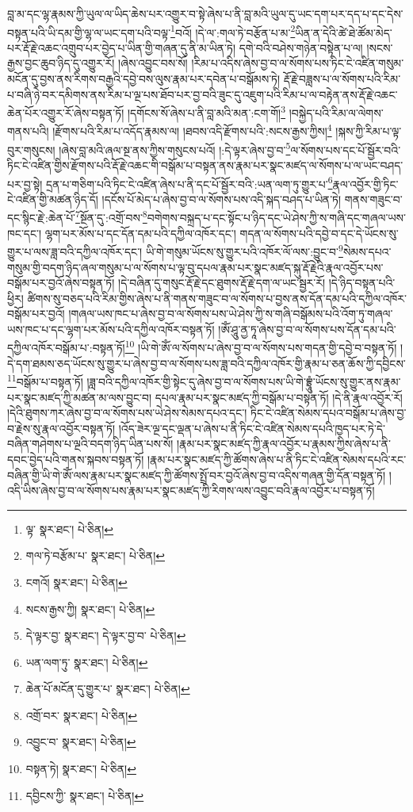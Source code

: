 བླ་མ་དང་ལྷ་རྣམས་ཀྱི་ཡུལ་ལ་ཡིད་ཆེས་པར་འགྱུར་བ་སྟེ་ཞེས་པ་ནི་བླ་མའི་ཡུལ་དུ་ཡང་དག་པར་དད་པ་དང་དེས་བསྟན་པའི་ཡི་དམ་གྱི་ལྷ་ལ་ཡང་དག་པའི་བལྟ་\footnote{ལྟ་  སྣར་ཐང་།  པེ་ཅིན། }བའོ། །དེ་ལ་:གལ་ཏེ་བརྩོན་པ་མ་\footnote{གལ་ཏེ་བརྩོམ་པ་  སྣར་ཐང་།  པེ་ཅིན། }ཡིན་ན་དེའི་ཚེ་ཐེ་ཚོམ་མེད་པར་རྡོ་རྗེ་འཆང་འགྲུབ་པར་བྱེད་པ་ཡིན་གྱི་གཞན་དུ་ནི་མ་ཡིན་ཏེ། དགེ་བའི་བཤེས་གཉེན་བསྟེན་པ་ལ། །སངས་རྒྱས་བྱང་ཆུབ་ཉིད་དུ་འགྱུར་རོ། །ཞེས་འབྱུང་བས་སོ། །རིམ་པ་འདིས་ཞེས་བྱ་བ་ལ་སོགས་པས་ཏིང་ངེ་འཛིན་གསུམ་མངོན་དུ་བྱས་ནས་རིགས་བརྒྱའི་དབྱེ་བས་ལུས་རྣམ་པར་དབེན་པ་བསྒོམས་ཏེ། རྡོ་རྗེ་བཟླས་པ་ལ་སོགས་པའི་རིམ་པ་བཞི་ཉེ་བར་དམིགས་ནས་རིམ་པ་ལྔ་པས་ཐོབ་པར་བྱ་བའི་ཟུང་དུ་འཇུག་པའི་རིམ་པ་ལ་བརྟེན་ནས་རྡོ་རྗེ་འཆང་ཆེན་པོར་འགྱུར་རོ་ཞེས་བསྟན་ཏོ། །དགོངས་སོ་ཞེས་པ་ནི་བླ་མའི་མན་:ངག་གོ།\footnote{ངགའོ།  སྣར་ཐང་།  པེ་ཅིན། } །བསྐྱེད་པའི་རིམ་ལ་ལེགས་གནས་པའི། །རྫོགས་པའི་རིམ་པ་འདོད་རྣམས་ལ། །ཐབས་འདི་རྫོགས་པའི་:སངས་རྒྱས་ཀྱིས།\footnote{སངས་རྒྱས་ཀྱི།  སྣར་ཐང་།  པེ་ཅིན། } །སྐས་ཀྱི་རིམ་པ་ལྟ་བུར་གསུངས། །ཞེས་བླ་མའི་ཞལ་སྔ་ནས་ཀྱིས་གསུངས་པའོ། །:དེ་ལྟར་ཞེས་བྱ་བ་\footnote{དེ་ལྟར་བྱ་  སྣར་ཐང་། དེ་ལྟར་བྱ་བ་  པེ་ཅིན། }ལ་སོགས་པས་དང་པོ་སྦྱོར་བའི་ཏིང་ངེ་འཛིན་གྱིས་རྫོགས་པའི་རྡོ་རྗེ་འཆང་གི་བསྒོམ་པ་བསྟན་ནས་རྣམ་པར་སྣང་མཛད་ལ་སོགས་པ་ལ་ཡང་བཤད་པར་བྱ་སྟེ། དྲན་པ་གཅིག་པའི་ཏིང་ངེ་འཛིན་ཞེས་པ་ནི་དང་པོ་སྦྱོར་བའི་:ཡན་ལག་ཏུ་གྱུར་པ་\footnote{ཡན་ལག་ཏུ་  སྣར་ཐང་།  པེ་ཅིན། }རྣལ་འབྱོར་གྱི་ཏིང་ངེ་འཛིན་གྱི་མཚན་ཉིད་དོ། །དངོས་པོ་མེད་པ་ཞེས་བྱ་བ་ལ་སོགས་པས་འདི་སྐད་བཤད་པ་ཡིན་ཏེ། གནས་གཟུང་བ་དང་སྙིང་རྗེ་:ཆེན་པོ་\footnote{ཆེན་པོ་མངོན་དུ་གྱུར་པ་  སྣར་ཐང་།  པེ་ཅིན། }སྔོན་དུ་:འགྲོ་བས་\footnote{འགྲོ་བར་  སྣར་ཐང་།  པེ་ཅིན། }བགེགས་བསྐྲད་པ་དང་སྟོང་པ་ཉིད་དང་ཡེ་ཤེས་ཀྱི་ས་གཞི་དང་གཞལ་ཡས་ཁང་དང་། ལྷག་པར་མོས་པ་དང་དོན་དམ་པའི་དཀྱིལ་འཁོར་དང་། གདན་ལ་སོགས་པའི་དབྱེ་བ་དང་དེ་ཡོངས་སུ་གྱུར་པ་ལས་ཟླ་བའི་དཀྱིལ་འཁོར་དང་། ཡི་གེ་གསུམ་ཡོངས་སུ་གྱུར་པའི་འཁོར་ལོ་ལས་:བྱུང་བ་\footnote{འབྱུང་བ་  སྣར་ཐང་།  པེ་ཅིན། }སེམས་དཔའ་གསུམ་གྱི་བདག་ཉིད་ཞལ་གསུམ་པ་ལ་སོགས་པ་ལྟ་བུ་དཔལ་རྣམ་པར་སྣང་མཛད་སྐུ་རྡོ་རྗེའི་རྣལ་འབྱོར་པས་བསྒོམ་པར་བྱའོ་ཞེས་བསྟན་ཏོ། །དེ་བཞིན་དུ་གསུང་རྡོ་རྗེ་དང་ཐུགས་རྡོ་རྗེ་དག་ལ་ཡང་སྦྱར་རོ། །དེ་ཉིད་བསྟན་པའི་ཕྱིར། ཚིགས་སུ་བཅད་པའི་རིམ་གྱིས་ཞེས་པ་ནི་གནས་གཟུང་བ་ལ་སོགས་པ་བྱས་ནས་དོན་དམ་པའི་དཀྱིལ་འཁོར་བསྒོམ་པར་བྱའོ། །གཞལ་ཡས་ཁང་པ་ཞེས་བྱ་བ་ལ་སོགས་པས་ཡེ་ཤེས་ཀྱི་ས་གཞི་བསྒོམས་པའི་འོག་ཏུ་གཞལ་ཡས་ཁང་པ་དང་ལྷག་པར་མོས་པའི་དཀྱིལ་འཁོར་བསྟན་ཏོ། །ཨོཾ་ཤཱུ་ནྱ་ཏཱ་ཞེས་བྱ་བ་ལ་སོགས་པས་དོན་དམ་པའི་དཀྱིལ་འཁོར་བསྒོམ་པ་:བསྟན་ཏོ།\footnote{བསྟན་ཏེ།  སྣར་ཐང་།  པེ་ཅིན། } །ཡི་གེ་ཨོཾ་ལ་སོགས་པ་ཞེས་བྱ་བ་ལ་སོགས་པས་གདན་གྱི་དབྱེ་བ་བསྟན་ཏོ། །དེ་དག་ཐམས་ཅད་ཡོངས་སུ་གྱུར་པ་ཞེས་བྱ་བ་ལ་སོགས་པས་ཟླ་བའི་དཀྱིལ་འཁོར་གྱི་རྣམ་པ་ཅན་ཆོས་ཀྱི་དབྱིངས་\footnote{དབྱིངས་ཀྱི་  སྣར་ཐང་།  པེ་ཅིན། }བསྒོམ་པ་བསྟན་ཏོ། །ཟླ་བའི་དཀྱིལ་འཁོར་གྱི་སྟེང་དུ་ཞེས་བྱ་བ་ལ་སོགས་པས་ཡི་གེ་བྷྲཱུཾ་ཡོངས་སུ་གྱུར་ནས་རྣམ་པར་སྣང་མཛད་ཀྱི་མཚན་མ་ལས་བྱུང་བ། དཔལ་རྣམ་པར་སྣང་མཛད་ཀྱི་བསྒོམ་པ་བསྟན་ཏོ། །དེ་ནི་རྣལ་འབྱོར་རོ། །དེའི་ཐུགས་ཀར་ཞེས་བྱ་བ་ལ་སོགས་པས་ཡེ་ཤེས་སེམས་དཔའ་དང་། ཏིང་ངེ་འཛིན་སེམས་དཔའ་བསྒོམ་པ་ཞེས་བྱ་བ་རྗེས་སུ་རྣལ་འབྱོར་བསྟན་ཏོ། །འོད་ཟེར་ལྔ་དང་ལྡན་པ་ཞེས་པ་ནི་ཏིང་ངེ་འཛིན་སེམས་དཔའི་ཁྱད་པར་ཏེ་དེ་བཞིན་གཤེགས་པ་ལྔའི་བདག་ཉིད་ཡིན་པས་སོ། །རྣམ་པར་སྣང་མཛད་ཀྱི་རྣལ་འབྱོར་པ་རྣམས་ཀྱིས་ཞེས་པ་ནི་དབང་བྱེད་པའི་གནས་སྐབས་བསྟན་ཏོ། །རྣམ་པར་སྣང་མཛད་ཀྱི་ཚོགས་ཞེས་པ་ནི་ཏིང་ངེ་འཛིན་སེམས་དཔའི་རང་བཞིན་གྱི་ཡི་གེ་ཨོཾ་ལས་རྣམ་པར་སྣང་མཛད་ཀྱི་ཚོགས་སྤྲོ་བར་བྱའོ་ཞེས་བྱ་བ་འདིས་གཞན་གྱི་དོན་བསྟན་ཏོ། །འདི་ཡིས་ཞེས་བྱ་བ་ལ་སོགས་པས་རྣམ་པར་སྣང་མཛད་ཀྱི་རིགས་ལས་འབྱུང་བའི་རྣལ་འབྱོར་པ་བསྟན་ཏོ། 